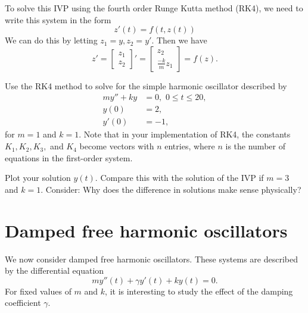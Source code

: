 To solve this IVP using the fourth order Runge Kutta method (RK4), we need to write this system in the form
\[z'(t) = f(t,z(t)) \]
We can do this by letting $z_1 = y, z_2 = y'$. Then we have \[     z'=
 \left[\begin{array}{c}z_1 \\z_2\end{array}\right]'  =  \left[\begin{array}{c}z_2 \\\frac{-k}{m}z_1\end{array}\right]= f(z).\]


\begin{problem} Use the RK4 method to solve for the simple harmonic oscillator
described by
\begin{align*}
my'' + ky &= 0,\,\, 0 \leq t \leq 20, \\
y(0) &= 2, \\
y'(0) &= -1,
\end{align*}
for $m = 1$ and $k =1$. Note that in your implementation of RK4, the constants $K_1, K_2, K_3,$ and $K_4$ become vectors with $n$ entries, where $n$ is the number of equations in the first-order system.

Plot your solution $y(t)$.  Compare this with the solution of the IVP if  $m = 3$ and $k =1$. Consider: Why does the difference in solutions make sense physically?
\end{problem}


\section*{Damped free harmonic oscillators} We now consider damped free harmonic oscillators. These systems are described by the differential equation
\[my''(t) +\gamma y'(t) + ky(t) = 0.\]
For fixed values of $m$ and $k$, it is interesting to study the effect of the damping coefficient $\gamma$.

